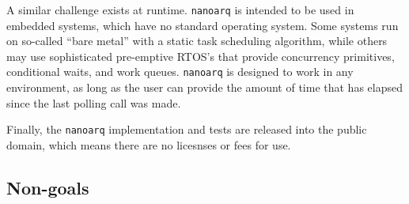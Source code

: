 \documentclass[11pt]{article}
\newcommand{\nanoarq}{\texttt{nanoarq}}
\begin{document}
\begin{description}
A similar challenge exists at runtime. \nanoarq{} is intended to be used in embedded systems, which have no standard operating system. Some systems run on so-called \enquote{bare metal} with a static task scheduling algorithm, while others may use sophisticated pre-emptive RTOS's that provide concurrency primitives, conditional waits, and work queues. \nanoarq{} is designed to work in any environment, as long as the user can provide the amount of time that has elapsed since the last polling call was made. \par

Finally, the \nanoarq{} implementation and tests are released into the public domain, which means there are no licesnses or fees for use.
\end{description}

\subsection{Non-goals}
\end{document}
